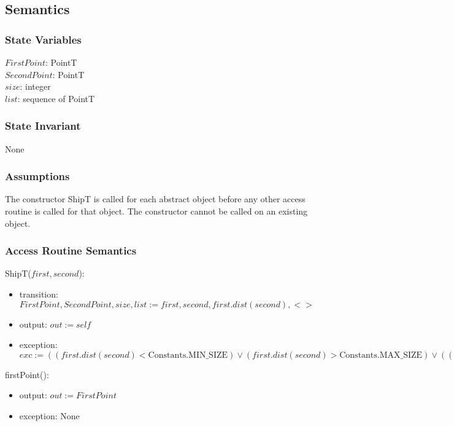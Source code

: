 \documentclass[12pt]{article}
\begin{document}
\subsection* {Semantics}

\subsubsection* {State Variables}

$FirstPoint$: PointT\\
$SecondPoint$: PointT\\
$size$: integer\\
$list$: sequence of PointT


\subsubsection* {State Invariant}

None

\subsubsection* {Assumptions}
The constructor ShipT is called for each abstract object before any other access routine is called for that
object.  The constructor cannot be called on an existing object.

\subsubsection* {Access Routine Semantics}

ShipT($first, second$):
\begin{itemize}
\item transition: $FirstPoint, SecondPoint, size,list := first, second, first.dist(second), <>$
\item output: $out := \mathit{self}$
\item exception:
 $exc := ((first.dist(second)< \mbox{Constants.MIN\_SIZE}) \lor (first.dist(second) > \mbox{Constants.MAX\_SIZE})   \lor ((first.\mbox{xcrd}() \neq second.\mbox{xcrd}()) \land (first.\mbox{ycrd}() \neq second.\mbox{ycrd}())) \Rightarrow \mbox{InvalidShipException})$
\end{itemize}

\noindent firstPoint():
\begin{itemize}
\item output: $out := FirstPoint$
\item exception: None
\end{itemize}
\end{document}
